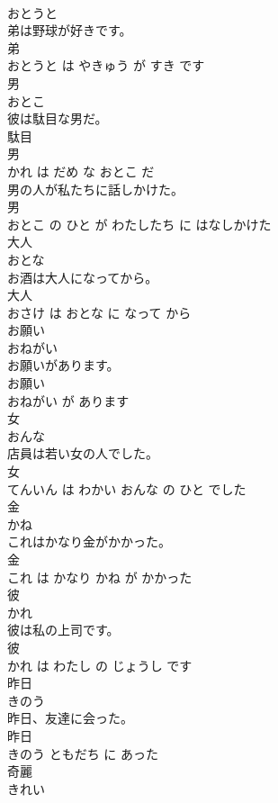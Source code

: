 \documentclass[8pt]{extreport}
\begin{document}
\begin{CJK}{UTF8}{min}
\\	おとうと			
\\	弟は野球が好きです。	
\\	弟 
\\	おとうと は やきゅう が すき です			
\\	男	
\\	おとこ			
\\	彼は駄目な男だ。	
\\	駄目 
\\	男 
\\	かれ は だめ な おとこ だ			
\\	男の人が私たちに話しかけた。	
\\	男 
\\	おとこ の ひと が わたしたち に はなしかけた			
\\	大人	
\\	おとな			
\\	お酒は大人になってから。	
\\	大人 
\\	おさけ は おとな に なって から			
\\	お願い	
\\	おねがい			
\\	お願いがあります。	
\\	お願い 
\\	おねがい が あります			
\\	女	
\\	おんな			
\\	店員は若い女の人でした。	
\\	女 
\\	てんいん は わかい おんな の ひと でした			
\\	金	
\\	かね			
\\	これはかなり金がかかった。	
\\	金 
\\	これ は かなり かね が かかった			
\\	彼	
\\	かれ			
\\	彼は私の上司です。	
\\	彼 
\\	かれ は わたし の じょうし です			
\\	昨日	
\\	きのう			
\\	昨日、友達に会った。	
\\	昨日 
\\	きのう ともだち に あった			
\\	奇麗	
\\	きれい			

\end{CJK}
\end{document}
